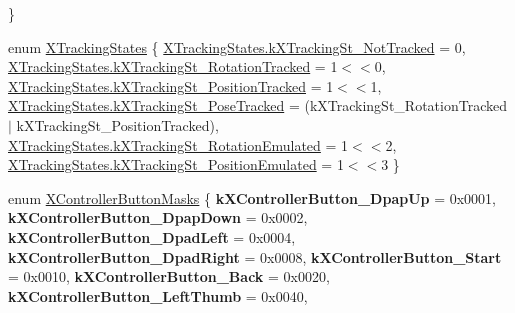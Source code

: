 \begin{DoxyCompactItemize}
 \}
\item 
enum \mbox{\hyperlink{class_ximmerse_1_1_input_system_1_1_x_device_plugin_aebd3ade57fdca1e612d0855fb119e4be}{X\+Tracking\+States}} \{ \newline
\mbox{\hyperlink{class_ximmerse_1_1_input_system_1_1_x_device_plugin_aebd3ade57fdca1e612d0855fb119e4bea66020f5d0617751e9c77b4a5719acd32}{X\+Tracking\+States.\+k\+X\+Tracking\+St\+\_\+\+Not\+Tracked}} = 0, 
\mbox{\hyperlink{class_ximmerse_1_1_input_system_1_1_x_device_plugin_aebd3ade57fdca1e612d0855fb119e4beab7af3f181e1346670fa7fc732fba69b5}{X\+Tracking\+States.\+k\+X\+Tracking\+St\+\_\+\+Rotation\+Tracked}} = 1$<$$<$0, 
\mbox{\hyperlink{class_ximmerse_1_1_input_system_1_1_x_device_plugin_aebd3ade57fdca1e612d0855fb119e4beacb1271487bf136938578ec55d0cb351b}{X\+Tracking\+States.\+k\+X\+Tracking\+St\+\_\+\+Position\+Tracked}} = 1$<$$<$1, 
\mbox{\hyperlink{class_ximmerse_1_1_input_system_1_1_x_device_plugin_aebd3ade57fdca1e612d0855fb119e4bea6e164bd53a5353f0802565aeaa89e7e9}{X\+Tracking\+States.\+k\+X\+Tracking\+St\+\_\+\+Pose\+Tracked}} = (k\+X\+Tracking\+St\+\_\+\+Rotation\+Tracked $\vert$ k\+X\+Tracking\+St\+\_\+\+Position\+Tracked), 
\newline
\mbox{\hyperlink{class_ximmerse_1_1_input_system_1_1_x_device_plugin_aebd3ade57fdca1e612d0855fb119e4bea8b27ecadc199d2cb213c0678198cb08b}{X\+Tracking\+States.\+k\+X\+Tracking\+St\+\_\+\+Rotation\+Emulated}} = 1$<$$<$2, 
\mbox{\hyperlink{class_ximmerse_1_1_input_system_1_1_x_device_plugin_aebd3ade57fdca1e612d0855fb119e4bea4c531debe48744e67126b6d18c06661d}{X\+Tracking\+States.\+k\+X\+Tracking\+St\+\_\+\+Position\+Emulated}} = 1$<$$<$3
 \}
\item 
\mbox{\label{class_ximmerse_1_1_input_system_1_1_x_device_plugin_a03c5fc5af0c493fdb0be72d754218cd1}} 
enum \mbox{\hyperlink{class_ximmerse_1_1_input_system_1_1_x_device_plugin_a03c5fc5af0c493fdb0be72d754218cd1}{X\+Controller\+Button\+Masks}} \{ \newline
{\bfseries k\+X\+Controller\+Button\+\_\+\+Dpap\+Up} = 0x0001, 
{\bfseries k\+X\+Controller\+Button\+\_\+\+Dpap\+Down} = 0x0002, 
{\bfseries k\+X\+Controller\+Button\+\_\+\+Dpad\+Left} = 0x0004, 
{\bfseries k\+X\+Controller\+Button\+\_\+\+Dpad\+Right} = 0x0008, 
\newline
{\bfseries k\+X\+Controller\+Button\+\_\+\+Start} = 0x0010, 
{\bfseries k\+X\+Controller\+Button\+\_\+\+Back} = 0x0020, 
{\bfseries k\+X\+Controller\+Button\+\_\+\+Left\+Thumb} = 0x0040, 

\end{DoxyCompactItemize}
